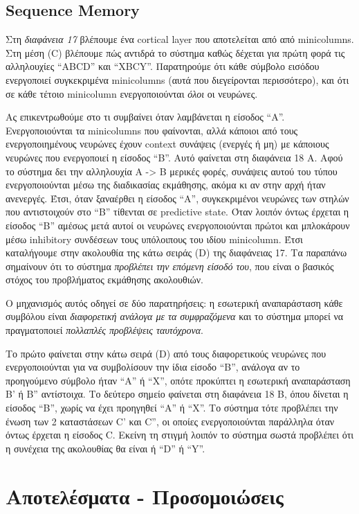 \subsection{Sequence Memory}

Στη \emph{διαφάνεια 17} \cite{continuous} βλέπουμε ένα cortical layer που αποτελείται από από minicolumns.
Στη μέση (C) βλέπουμε πώς αντιδρά το σύστημα καθώς δέχεται για πρώτη φορά τις αλληλουχίες ``ABCD'' και ``XBCY''.
Παρατηρούμε ότι κάθε σύμβολο εισόδου ενεργοποιεί συγκεκριμένα minicolumns (αυτά που διεγείρονται περισσότερο), και ότι σε κάθε τέτοιο minicolumn ενεργοποιούνται \emph{όλοι} οι νευρώνες.

Ας επικεντρωθούμε στο τι συμβαίνει όταν λαμβάνεται η είσοδος ``A''.
Ενεργοποιούνται τα minicolumns που φαίνονται, αλλά κάποιοι από τους ενεργοποιημένους νευρώνες έχουν context συνάψεις (ενεργές ή μη) με κάποιους νευρώνες που ενεργοποιεί η είσοδος ``B''.
Αυτό φαίνεται στη διαφάνεια 18 Α.
Αφού το σύστημα δει την αλληλουχία A -> B μερικές φορές, συνάψεις αυτού του τύπου ενεργοποιούνται μέσω της διαδικασίας εκμάθησης, ακόμα κι αν στην αρχή ήταν ανενεργές.
Έτσι, όταν ξαναέρθει η είσοδος ``A'', συγκεκριμένοι νευρώνες των στηλών που αντιστοιχούν στο ``B'' τίθενται σε predictive state.
Όταν λοιπόν όντως έρχεται η είσοδος ``B'' αμέσως μετά αυτοί οι νευρώνες ενεργοποιούνται πρώτοι και μπλοκάρουν μέσω inhibitory συνδέσεων τους υπόλοιπους του ιδίου minicolumn.
Έτσι καταλήγουμε στην ακολουθία της κάτω σειράς (D) της διαφάνειας 17.
Τα παραπάνω σημαίνουν ότι το σύστημα \emph{προβλέπει την επόμενη είσοδό του}, που είναι ο βασικός στόχος του προβλήματος εκμάθησης ακολουθιών.

Ο μηχανισμός αυτός οδηγεί σε δύο παρατηρήσεις: η εσωτερική αναπαράσταση κάθε συμβόλου είναι \emph{διαφορετική ανάλογα με τα συμφραζόμενα} και το σύστημα μπορεί να πραγματοποιεί \emph{πολλαπλές προβλέψεις ταυτόχρονα}.

Το πρώτο φαίνεται στην κάτω σειρά (D) από τους διαφορετικούς νευρώνες που ενεργοποιούνται για να συμβολίσουν την ίδια είσοδο ``B'', ανάλογα αν το προηγούμενο σύμβολο ήταν ``A'' ή ``X'', οπότε προκύπτει η εσωτερική αναπαράσταση B' ή B'' αντίστοιχα.
Το δεύτερο σημείο φαίνεται στη διαφάνεια 18 Β, όπου δίνεται η είσοδος ``B'', χωρίς να έχει προηγηθεί ``Α'' ή ``Χ''.
Το σύστημα τότε προβλέπει την ένωση των 2 καταστάσεων C' και C'', οι οποίες ενεργοποιούνται παράλληλα όταν όντως έρχεται η είσοδος C.
Εκείνη τη στιγμή λοιπόν το σύστημα σωστά προβλέπει ότι η συνέχεια της ακολουθίας θα είναι ή ``D'' ή ``Y''.

\section{Αποτελέσματα - Προσομοιώσεις}

